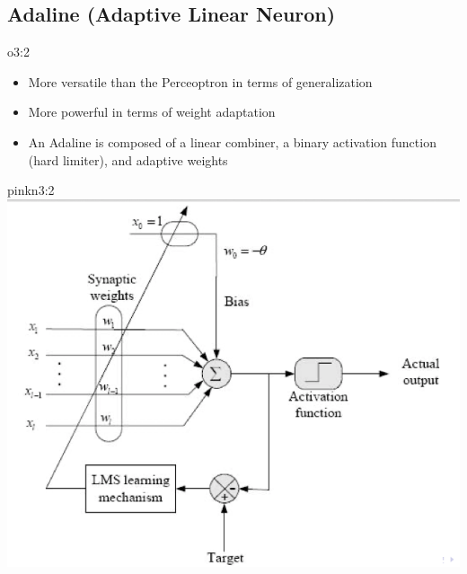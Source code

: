 \documentclass{tron}
\begin{document}
\newpage
\subsection{Adaline (Adaptive Linear Neuron)}
\begin{overview}[Adaline]{o3:2}
	\begin{itemize}
		\item More versatile than the Perceoptron in terms of generalization
		\item More powerful in terms of weight adaptation
		\item An Adaline is composed of a linear combiner, a binary activation function (hard limiter), and adaptive weights
	\end{itemize}
	
	\begin{note}{pink}{n3:2}
		\includegraphics[width=0.5\columnwidth]{Figs/Lec4/adaline}
	\end{note}
\end{overview}
\end{document}
